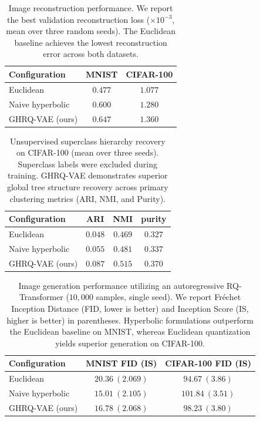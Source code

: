 \documentclass[12pt]{report}
\begin{document}
\begin{table}[h]
\centering
\caption{Image reconstruction performance. We report the best validation reconstruction loss ($\times10^{-3}$, mean over three random seeds). The Euclidean baseline achieves the lowest reconstruction error across both datasets.}
\label{tab:img_recon}
\begin{tabular}{lcc}
\hline
Configuration & MNIST & CIFAR-100 \\
\hline
Euclidean & $\mathbf{0.477}$ & $\mathbf{1.077}$ \\
Naive hyperbolic & $0.600$ & $1.280$ \\
GHRQ-VAE (ours) & $0.647$ & $1.360$ \\
\hline
\end{tabular}
\end{table}

\begin{table}[h]
\centering
\caption{Unsupervised superclass hierarchy recovery on CIFAR-100 (mean over three seeds). Superclass labels were excluded during training. GHRQ-VAE demonstrates superior global tree structure recovery across primary clustering metrics (ARI, NMI, and Purity).}
\label{tab:img_hier}
\begin{tabular}{lccc}
\hline
Configuration & ARI & NMI & purity \\
\hline
Euclidean & $0.048$ & $0.469$ & $0.327$ \\
Naive hyperbolic & $0.055$ & $0.481$ & $0.337$ \\
GHRQ-VAE (ours) & $\mathbf{0.087}$ & $\mathbf{0.515}$ & $\mathbf{0.370}$ \\
\hline
\end{tabular}
\end{table}

\begin{table}[h]
\centering
\caption{Image generation performance utilizing an autoregressive RQ-Transformer ($10{,}000$ samples, single seed). We report Fr\'echet Inception Distance (FID, lower is better) and Inception Score (IS, higher is better) in parentheses. Hyperbolic formulations outperform the Euclidean baseline on MNIST, whereas Euclidean quantization yields superior generation on CIFAR-100.}
\label{tab:img_gen}
\begin{tabular}{lcc}
\hline
Configuration & MNIST FID (IS) & CIFAR-100 FID (IS) \\
\hline
Euclidean & $20.36\ (2.069)$ & $\mathbf{94.67}\ (3.86)$ \\
Naive hyperbolic & $\mathbf{15.01}\ (2.105)$ & $101.84\ (3.51)$ \\
GHRQ-VAE (ours) & $16.78\ (2.068)$ & $98.23\ (3.80)$ \\
\hline
\end{tabular}
\end{table}
\end{document}
